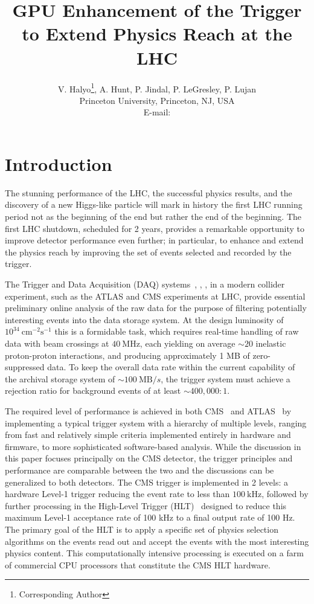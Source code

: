 \documentclass{JINST}
\title{GPU Enhancement of the Trigger to Extend Physics Reach at the LHC}
\author{V. Halyo\thanks{Corresponding Author}, A. Hunt, P. Jindal, P. LeGresley, P. Lujan \\
\llap Princeton University, Princeton, NJ, USA \\
E-mail: \email{vhalyo@gmail.com}}
\begin{document}
% 
% 
\section{Introduction} 
% 

The stunning performance of the LHC, the successful physics results, and the discovery of 
a new Higgs-like particle will mark in history the first LHC running period not as the beginning of the end but rather
the end of the beginning. The first LHC shutdown, scheduled for 2 years, provides a remarkable opportunity to
improve detector performance even further; in particular, to enhance and extend the physics reach by improving the set of events selected and recorded by the trigger.

The Trigger and Data Acquisition (DAQ) systems~\cite{Sphicas:2002gg}, \cite{ATLAS:2003aa}, \cite{Chatrchyan:2008aa}, \cite{Aad:2008zzm}
in a modern collider experiment, such as the ATLAS and CMS experiments at LHC, provide essential preliminary online analysis of the raw data for the purpose of
filtering potentially interesting events into the data storage system.
At the design luminosity of $10^{34}~\mathrm{cm}^{-2}\mathrm{s}^{-1}$ this is a formidable task,
which requires real-time handling of raw data with beam crossings at $40~\mathrm{MHz}$, each yielding
on average ${\sim}20$ inelastic proton-proton interactions, and producing approximately 1 MB of zero-suppressed data.
To keep the overall data rate within the current capability of the archival storage
system of ${\sim}100~\mathrm{MB}/s$, the trigger system must achieve a rejection ratio for background
events of at least ${\sim}400,000:1$.

The required level of performance is achieved in both CMS~\cite{Chatrchyan:2008aa} and ATLAS~\cite{Aad:2008zzm}
 by implementing a typical trigger system with a hierarchy of multiple levels, ranging from fast and relatively simple criteria implemented
entirely in hardware and firmware, to more sophisticated software-based analysis. 
While the discussion in this paper focuses principally on the CMS detector, the trigger principles and performance are
comparable between the two and the discussions can be generalized to both detectors.
The CMS trigger is implemented in 2 levels: a hardware Level-1 trigger reducing the event rate
to less than $100~\mathrm{kHz}$, followed by further processing in the High-Level Trigger (HLT)~\cite{Sakulin:2007rj}
designed to reduce this maximum Level-1 acceptance rate of 100 kHz to a final output rate of 100 Hz.
The primary goal of the HLT is to apply a specific set of
physics selection algorithms on the events read out and accept the events with the most interesting physics 
content. This computationally intensive processing is executed on a farm of commercial CPU processors that
constitute the CMS HLT hardware.
\end{document}
